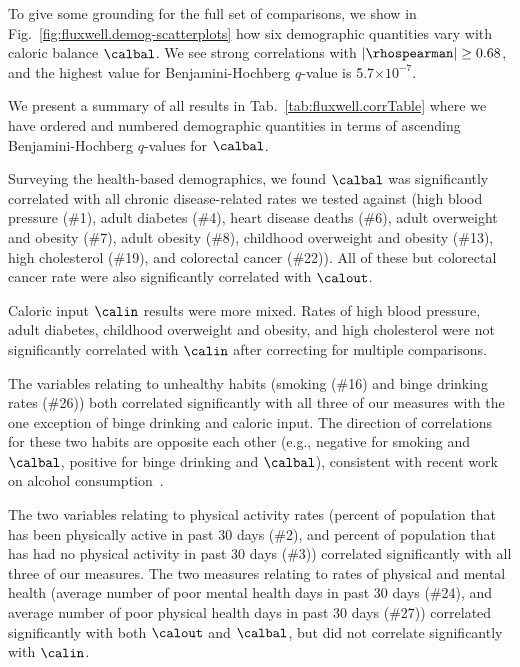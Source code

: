 To give some grounding for the full set of comparisons,
we show in Fig.~\ref{fig:fluxwell.demog-scatterplots}
how six demographic quantities vary with caloric balance $\calbal$.
We see strong correlations with $|\rhospearman| \ge 0.68$,
and the highest value for Benjamini-Hochberg $q$-value is 5.7$\times$$10^{-7}$.

We present a summary of all results in Tab.~\ref{tab:fluxwell.corrTable}
where we have ordered and numbered demographic quantities in terms of
ascending  
Benjamini-Hochberg $q$-values for $\calbal$.

Surveying the health-based demographics,
we found $\calbal$  
was significantly correlated with 
all chronic
disease-related rates we tested against (high blood pressure (\#1),
adult diabetes (\#4), heart disease deaths (\#6), adult overweight and
obesity (\#7), adult obesity (\#8), childhood overweight and obesity
(\#13), high cholesterol (\#19), and colorectal cancer (\#22)).
All of these but colorectal
cancer rate were also significantly correlated with $\calout$.

Caloric input $\calin$ results were more mixed.  
Rates of high blood pressure,
adult diabetes, childhood overweight and obesity, and high cholesterol
were not significantly correlated with $\calin$ after
correcting for multiple comparisons.  

The variables relating to
unhealthy habits (smoking (\#16) and binge drinking rates (\#26)) both
correlated significantly with all three of our measures with
the one exception of binge drinking and caloric input.
The direction of correlations for these two habits 
are opposite each other (e.g., negative for smoking and $\calbal$, 
positive for binge drinking and $\calbal$), consistent with 
recent work on alcohol consumption~\cite{french2009a}.

The two variables relating to physical activity rates (percent of
population that has been physically active in past 30 days (\#2), and
percent of population that has had no physical activity in past 30
days (\#3)) correlated significantly with all three of our measures.
The two measures relating to rates of physical and mental health
(average number of poor mental health days in past 30 days (\#24), and
average number of poor physical health days in past 30 days (\#27))
correlated significantly with both $\calout$ and $\calbal$,
but did not correlate significantly with $\calin$.

